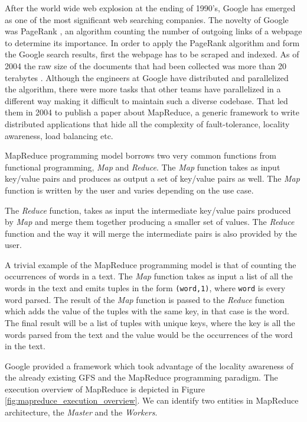 After the world wide web explosion at the ending of 1990's, Google has
emerged as one of the most significant web searching companies.
The novelty of Google was PageRank \cite{ilprints361}, an
algorithm counting the number of outgoing links of a webpage to determine its
importance. In order to apply the PageRank algorithm and form the
Google search results, first the webpage has to be scraped and
indexed. As of 2004 the raw size of the documents that had been
collected was more than 20 terabytes
\cite{Dean:2004:MSD:1251254.1251264}. Although the engineers at Google
have distributed and parallelized the algorithm, there were more tasks
that other teams have parallelized in a different way making it
difficult to maintain such a diverse codebase. That led them in 2004
to publish a paper about MapReduce, a generic framework to write distributed
applications that hide all the complexity of fault-tolerance, locality
awareness, load balancing etc.

MapReduce programming model borrows two very common functions from
functional programming, \emph{Map} and \emph{Reduce}. The \emph{Map}
function takes as input key/value pairs and produces as output a set
of key/value pairs as well. The \emph{Map} function is written by the
user and varies depending on the use case.

The \emph{Reduce} function, takes as input the
intermediate key/value pairs produced by \emph{Map} and merge them
together producing a smaller set of values. The \emph{Reduce} function
and the way it will merge the intermediate pairs is also provided by
the user.

A trivial example of the MapReduce programming model is that of
counting the occurrences of words in a text. The \emph{Map} function
takes as input a list of all the words in the text and emits tuples
in the form \texttt{(word,1)}, where \texttt{word} is every word
parsed. The result of the \emph{Map} function is passed to the
\emph{Reduce} function which adds the value of the tuples with the
same key, in that case is the word. The final result will be a list of
tuples with unique keys, where the key is all the words parsed from the text and the
value would be the occurrences of the word in the text.

Google provided a framework which took advantage of the locality
awareness of the already existing GFS and the MapReduce programming
paradigm. The execution overview of MapReduce is depicted in Figure
\ref{fig:mapreduce_execution_overview}. We can identify two entities
in MapReduce architecture, the \emph{Master} and the \emph{Workers}.

